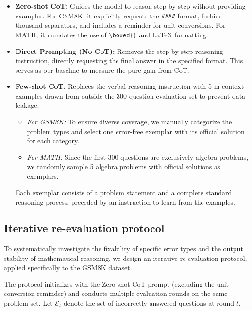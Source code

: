 \documentclass{article}
\begin{document}
\begin{itemize}
    \item \textbf{Zero-shot CoT:} Guides the model to reason step-by-step without providing examples. For GSM8K, it explicitly requests the \texttt{\#\#\#\#} format, forbids thousand separators, and includes a reminder for unit conversions. For MATH, it mandates the use of \texttt{\textbackslash boxed\{\}} and LaTeX formatting.
    \item \textbf{Direct Prompting (No CoT):} Removes the step-by-step reasoning instruction, directly requesting the final answer in the specified format. This serves as our baseline to measure the pure gain from CoT.
    \item \textbf{Few-shot CoT:} Replaces the verbal reasoning instruction with 5 in-context examples drawn from outside the 300-question evaluation set to prevent data leakage. 
    \begin{itemize}
        \item \textit{For GSM8K:} To ensure diverse coverage, we manually categorize the problem types and select one error-free exemplar with its official solution for each category.
        \item \textit{For MATH:} Since the first 300 questions are exclusively algebra problems, we randomly sample 5 algebra problems with official solutions as exemplars.
    \end{itemize}
    Each exemplar consists of a problem statement and a complete standard reasoning process, preceded by an instruction to learn from the examples.
\end{itemize}

\subsection{Iterative re-evaluation protocol}
\label{sec:reeval}
To systematically investigate the fixability of specific error types and the output stability of mathematical reasoning, we design an iterative re-evaluation protocol, applied specifically to the GSM8K dataset. 

The protocol initializes with the Zero-shot CoT prompt (excluding the unit conversion reminder) and conducts multiple evaluation rounds on the same problem set. Let $\mathcal{E}_t$ denote the set of incorrectly answered questions at round $t$.
\end{document}
